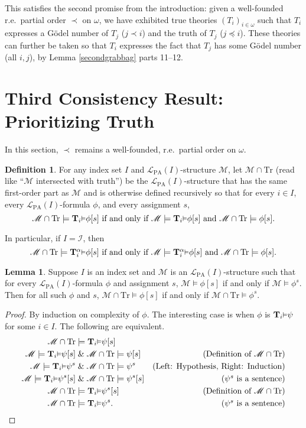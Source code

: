 \documentclass[reqno]{article}
\theoremstyle{definition}
\newtheorem{lemma}[theorem]{Lemma}
\newtheorem{definition}[theorem]{Definition}
\def\L{\mathscr{L}}
\def\M{\mathscr{M}}
\def\T{\mathbf{T}}
\def\LPA{\L_{\mathrm{PA}}}
\def\indset{\mathcal I}
\def\Tr{\mathrm{Tr}}
\def\ctr{\cap\Tr}
\renewcommand{\Pr}[1]{\T_{#1}\mbox{\small${\vDash}$}}
\newcommand{\Prr}[2]{\T^{#1}_{#2}\mbox{\small${\vDash}$}}
\begin{document}
This satisfies the second promise from the introduction:
given a well-founded r.e.~partial order $\prec$ on $\omega$,
we have exhibited true theories $(T_i)_{i\in\omega}$ such that $T_i$ expresses 
a G\"odel number of $T_j$ ($j\prec i$) and the truth of $T_j$ ($j\preceq 
i$).  These theories can further be taken so that $T_i$ expresses the fact 
that $T_j$ has some G\"odel number (all $i,j$), by Lemma \ref{secondgrabbag} parts 11--12.


\section{Third Consistency Result: Prioritizing Truth}


In this section, $\prec$ remains a well-founded, r.e.~partial order on 
$\omega$.


\begin{definition}
For any index set $I$ and $\LPA(I)$-structure
$\M$, let $\M\cap\Tr$ (read like ``$\M$ intersected with truth'')
be the $\LPA(I)$-structure that has
the same first-order part as $\M$ and is otherwise
defined recursively so that for every $i\in I$,
every $\LPA(I)$-formula $\phi$,
and every assignment $s$,
\[
\mbox{$\M\cap\Tr \models \Pr i\phi[s]$ if and only if
$\M\models \Pr i\phi[s]$ and $\M\cap\Tr\models \phi[s]$.}
\]
\end{definition}

In particular, if $I=\indset$, then
\[
\mbox{$\M\cap\Tr \models \Prr\alpha i\phi[s]$ if and only if
$\M\models\Prr\alpha i\phi[s]$ and $\M\cap\Tr\models\phi[s]$.}
\]

\begin{lemma}
\label{captruepreservesintent}
Suppose 
$I$ is an index set and $\M$ is an $\LPA(I)$-structure
such that for every $\LPA(I)$-formula $\phi$ and assignment $s$,
$\M\models\phi[s]$ if and only if $\M\models\phi^s$.
Then for all such $\phi$ and $s$,
$\M\cap\Tr\models\phi[s]$ if and only if $\M\cap\Tr\models\phi^s$.
\end{lemma}

\begin{proof}
By induction on complexity of $\phi$.
The interesting case is when $\phi$ is $\Pr i\psi$ for some $i\in I$.
The following are equivalent.
\begin{align*}
\M\ctr &\models \Pr i\psi[s]\\
\M \models \Pr i \psi[s] &\mathrel\& \M\ctr \models \psi[s]
  &\mbox{(Definition of $\M\ctr$)}\\
\M \models \Pr i\psi^s &\mathrel\& \M\ctr \models \psi^s
  &\mbox{(Left: Hypothesis, Right: Induction)}\\
\M \models \Pr i\psi^s[s] &\mathrel\& \M\ctr \models \psi^s[s]
  &\mbox{($\psi^s$ is a sentence)}\\
\M\ctr &\models \Pr i\psi^s[s]
  &\mbox{(Definition of $\M\ctr$)}\\
\M\ctr &\models \Pr i \psi^s.
  &\mbox{($\psi^s$ is a sentence)}
\end{align*}
\end{proof}
\end{document}
